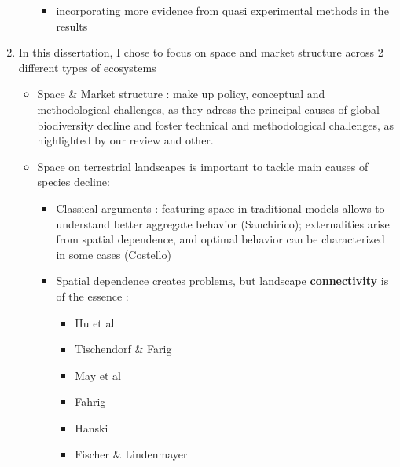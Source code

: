 \begin{enumerate}
\begin{itemize}
\begin{itemize}
\item incorporating more evidence from quasi experimental methods in the results
\end{itemize}
\end{itemize}
\item In this dissertation, I chose to focus on space and market structure across 2 different types of ecosystems
\begin{itemize}
\item Space \& Market structure : make up policy, conceptual and methodological challenges, as they adress the principal causes of global biodiversity decline and foster technical and methodological challenges, as highlighted by our review and other. 
\item Space on terrestrial landscapes is important to tackle main causes of species decline: 

\begin{itemize}
\item Classical arguments : featuring space in traditional models allows to understand better aggregate behavior (Sanchirico); externalities arise from spatial dependence, and optimal behavior can be characterized in some cases (Costello)

\item Spatial dependence creates problems, but landscape \textbf{connectivity} is of the essence : 
\begin{itemize}
\item Hu et al
\item Tischendorf \& Farig
\item May et al
\item Fahrig
\item Hanski
\item Fischer \& Lindenmayer
\end{itemize}


\end{itemize}
\end{itemize}
\end{enumerate}
